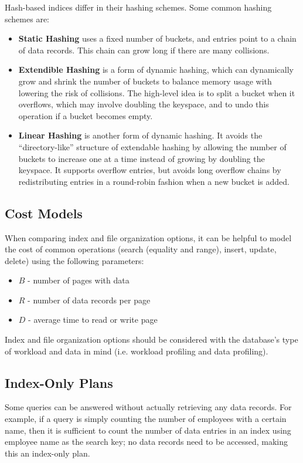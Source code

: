 \documentclass[12pt,titlepage]{article}
\begin{document}
        Hash-based indices differ in their hashing schemes. Some common hashing schemes are:
        \begin{itemize}
          \item \textbf{Static Hashing} uses a fixed number of buckets, and entries point to a chain of data records. This chain can grow
            long if there are many collisions.
          \item \textbf{Extendible Hashing} is a form of dynamic hashing, which can dynamically grow and shrink the number of buckets to balance
            memory usage with lowering the risk of collisions. The high-level idea is to split a bucket when it overflows, which may involve
            doubling the keyspace, and to undo this operation if a bucket becomes empty.
          \item \textbf{Linear Hashing} is another form of dynamic hashing. It avoids the ``directory-like'' structure of extendable hashing by
            allowing the number of buckets to increase one at a time instead of growing by doubling the keyspace. It supports overflow entries,
            but avoids long overflow chains by redistributing entries in a round-robin fashion when a new bucket is added.
        \end{itemize}

    \subsection{Cost Models}
      When comparing index and file organization options, it can be helpful to model the cost of common operations (search (equality and range),
      insert, update, delete) using the following parameters:
      \begin{itemize}
        \item $B$ - number of pages with data
        \item $R$ - number of data records per page
        \item $D$ - average time to read or write page
      \end{itemize}

      Index and file organization options should be considered with the database's type of workload and data in mind (i.e. workload profiling and
      data profiling).

    \subsection{Index-Only Plans}
      Some queries can be answered without actually retrieving any data records. For example, if a query is simply counting the number of employees
      with a certain name, then it is sufficient to count the number of data entries in an index using employee name as the search key; no data records
      need to be accessed, making this an index-only plan.
\end{document}
